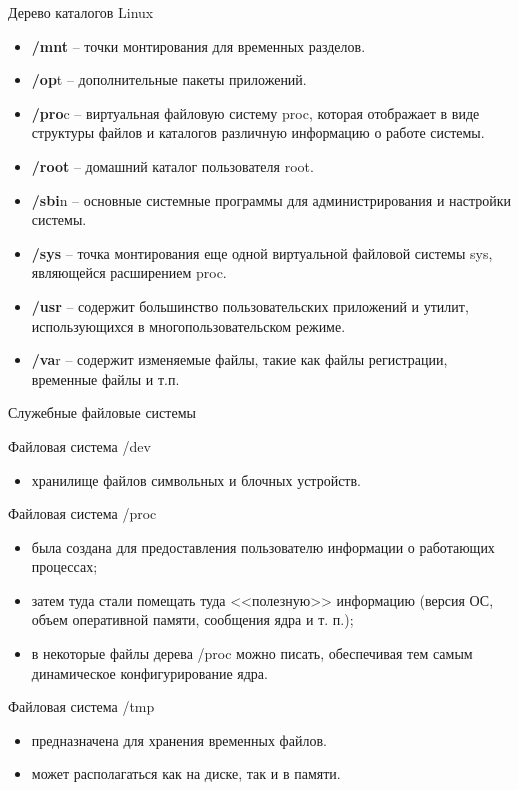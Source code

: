 \documentclass[xcolor=table]{beamer}
\begin{document}
\begin{frame}[fragile]{Дерево каталогов Linux}
	\begin{itemize}
		\item \textbf{/mnt} -- точки монтирования для временных разделов.
		\item \textbf{/op}t -- дополнительные пакеты приложений.
		\item \textbf{/pro}c -- виртуальная файловую систему proc, которая отображает в виде структуры файлов и каталогов различную информацию о работе системы.
		\item \textbf{/root} -- домашний каталог пользователя root.
		\item \textbf{/sbi}n -- основные системные программы для администрирования и настройки системы.
		\item \textbf{/sys} -- точка монтирования еще одной виртуальной файловой системы sys, являющейся расширением proc.
		\item \textbf{/usr} -- содержит большинство пользовательских приложений и утилит, использующихся в многопользовательском режиме.
		\item \textbf{/va}r -- содержит изменяемые файлы, такие как файлы регистрации, временные файлы и т.п.		
	\end{itemize}
\end{frame}

\begin{frame}[fragile]{Служебные файловые системы}
	\begin{block}{Файловая система /dev}
		\begin{itemize}
			\item хранилище файлов символьных и блочных устройств.
		\end{itemize}
	\end{block}
	\begin{block}{Файловая система /proc}
		\begin{itemize}
			\item  была создана для предоставления пользователю информации о работающих процессах; 
			\item  затем туда стали помещать туда <<полезную>> информацию (версия ОС, объем оперативной памяти, сообщения ядра и т. п.);
			\item  в некоторые файлы дерева /proc можно писать, обеспечивая тем самым динамическое конфигурирование ядра.
		\end{itemize}
	\end{block}
	\begin{block}{Файловая система /tmp}
		\begin{itemize}
			\item предназначена для хранения временных файлов. 
			\item может располагаться как на диске, так и в памяти.
		\end{itemize}
	\end{block}
\end{frame}
\end{document}
